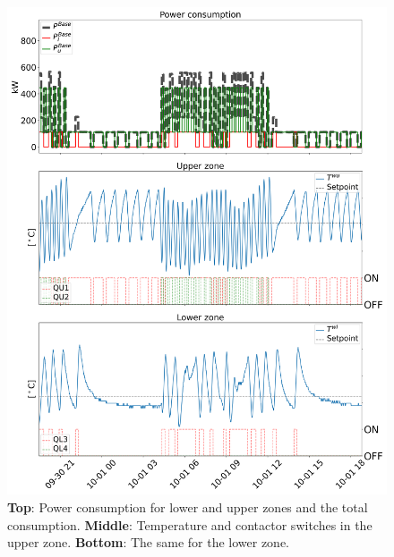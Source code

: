 \documentclass[conference]{IEEEtran}
\begin{document}
\begin{figure}[t]
    \centering
    \includegraphics[width=0.90\columnwidth]{../figures/data_visualization.png}
    \caption{\small{\textbf{Top}: Power consumption for lower and upper zones and the total consumption. \textbf{Middle}: Temperature and contactor switches in the upper zone. \textbf{Bottom}: The same for the lower zone.
                \vspace{-4mm}}}
    \label{fig:data_visualization}
\end{figure}

\vspace{0.2mm}
\end{document}
